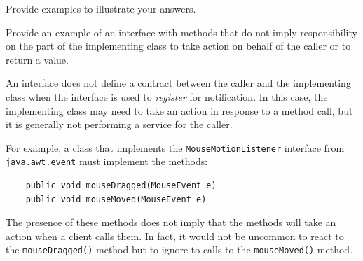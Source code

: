 \documentclass[answers,12pt,a4paper]{exam}
\begin{document}
\begin{questions}
Provide examples to illustrate your answers.

\question %
Provide an example of an interface with methods that do not imply responsibility 
on the part of the implementing class to take action on behalf of the caller or 
to return a value.

\begin{solution}
An interface does not define a contract between the caller and the implementing 
class when the interface is used to \emph{register} for notification. In this case, 
the implementing class may need to take an action in response to a method call, 
but it is generally not performing a service for the caller.

For example, a class that implements the \verb!MouseMotionListener! interface from
\verb!java.awt.event! must implement the methods: 
\begin{Verbatim}
	public void mouseDragged(MouseEvent e)
	public void mouseMoved(MouseEvent e)
\end{Verbatim}	
The presence of these methods does not imply that the methods will take an 
action when a client calls them. In fact, it would not be uncommon to react to the 
\verb!mouseDragged()! method but to ignore to calls to the 
\verb!mouseMoved()! method.	
\end{solution}


\end{questions}
\end{document}
